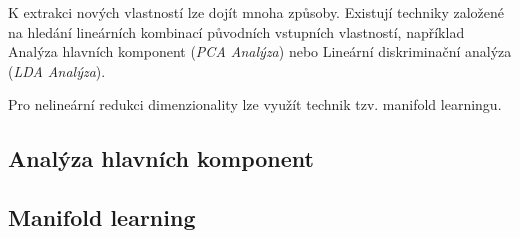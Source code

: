 K extrakci nových vlastností lze dojít mnoha způsoby.
Existují techniky založené na hledání lineárních kombinací původních vstupních vlastností, například Analýza hlavních komponent (\emph{PCA Analýza}) nebo Lineární diskriminační analýza (\emph{LDA Analýza}).

Pro nelineární redukci dimenzionality lze využít technik tzv. manifold learningu.


\subsection{Analýza hlavních komponent}
\label{sec:pca}

\subsection{Manifold learning}